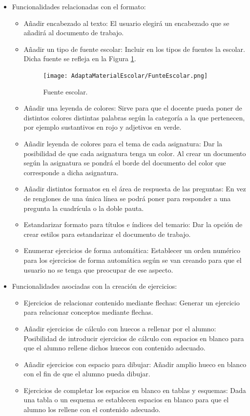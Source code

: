 \begin{itemize}
  \item Funcionalidades relacionadas con el formato:
        \begin{itemize}
          \item Añadir encabezado al texto: El usuario elegirá un encabezado que se añadirá al documento de trabajo.
          \item Añadir un tipo de fuente escolar: Incluir en los tipos de fuentes la escolar. Dicha fuente se refleja en la Figura \ref{escolar}.
                \begin{figure}[ht!]
                  \centering
                  \texttt{[image: AdaptaMaterialEscolar/FunteEscolar.png]}
                  \caption{Fuente escolar.}
                  \label{escolar}
                \end{figure}
          \item Añadir una leyenda de colores: Sirve para que el docente pueda poner de distintos colores distintas palabras según la categoría a la que pertenecen, por ejemplo sustantivos en rojo y adjetivos en verde.
          \item Añadir leyenda de colores para el tema de cada asignatura: Dar la posibilidad de que cada asignatura tenga un color. Al crear un documento según la asignatura se pondrá el borde del documento del color que corresponde a dicha asignatura.
          \item Añadir distintos formatos en el área de respuesta de las preguntas: En vez de renglones de una única línea se podrá poner para responder a una pregunta la cuadrícula o la doble pauta.
          \item Estandarizar formato para títulos e índices del temario: Dar la opción de crear estilos para estandarizar el documento de trabajo.
          \item Enumerar ejercicios de forma automática: Establecer un orden numérico para los ejercicios de forma automática según se van creando para que el usuario no se tenga que preocupar de ese aspecto.
        \end{itemize}

  \item Funcionalidades asociadas con la creación de ejercicios:
        \begin{itemize}
          \item Ejercicios de relacionar contenido mediante flechas: Generar un ejercicio para relacionar conceptos mediante flechas.
          \item Añadir ejercicios de cálculo con huecos a rellenar por el alumno: Posibilidad de introducir ejercicios de cálculo con espacios en blanco para que el alumno rellene dichos huecos con contenido adecuado.
          \item Añadir ejercicios con espacio para dibujar: Añadir amplio hueco en blanco con el fin de que el alumno pueda dibujar.
          \item Ejercicios de completar los espacios en blanco en tablas y esquemas: Dada una tabla o un esquema se establecen espacios en blanco para que el alumno los rellene con el contenido adecuado.
        \end{itemize}


\end{itemize}
